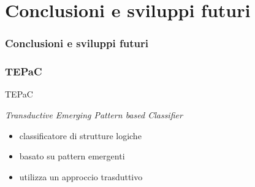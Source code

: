 \documentclass{beamer}
\begin{document}

\section{Conclusioni e sviluppi futuri}
\begin{frame}
\frametitle{Conclusioni e sviluppi futuri}
\end{frame}


\begin{frame}
\frametitle{TEPaC}
TEPaC

\emph{Transductive Emerging Pattern based Classifier}

\begin{itemize}
\item classificatore di strutture logiche
\item basato su pattern emergenti
\item utilizza un approccio trasduttivo
\end{itemize}

\end{frame}

\end{document}
